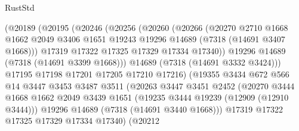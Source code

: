 \begin{lexlean}{RustStd}
\begin{coremodule}
                        (@20189
                          (@20195
                            (@20246
                              (@20256
                                (@20260
                                  (@20266
                                    (@20270
                                      @2710
                                      @1668
                                      @1662
                                      @2049
                                      @3406
                                      @1651
                                      @19243
                                      @19296
                                      @14689
                                      (@7318 (@14691 @3407 @1668)))
                                    @17319
                                    @17322
                                    @17325
                                    @17329
                                    @17334
                                    @17340))
                                @19296
                                @14689
                                (@7318 (@14691 @3399 @1668)))
                              @14689
                              (@7318 (@14691 @3332 @3424)))
                            @17195
                            @17198
                            @17201
                            @17205
                            @17210
                            @17216)
                          (@19355
                            @3434
                            @672
                            @566
                            @14
                            @3447
                            @3453
                            @3487
                            @3511
                            (@20263
                              @3447
                              @3451
                              @2452
                              (@20270
                                @3444
                                @1668
                                @1662
                                @2049
                                @3439
                                @1651
                                (@19235 @3444 @19239 (@12909 (@12910 @3444)))
                                @19296
                                @14689
                                (@7318 (@14691 @3440 @1668)))
                              @17319
                              @17322
                              @17325
                              @17329
                              @17334
                              @17340)
                            (@20212

\end{coremodule}
\end{lexlean}
